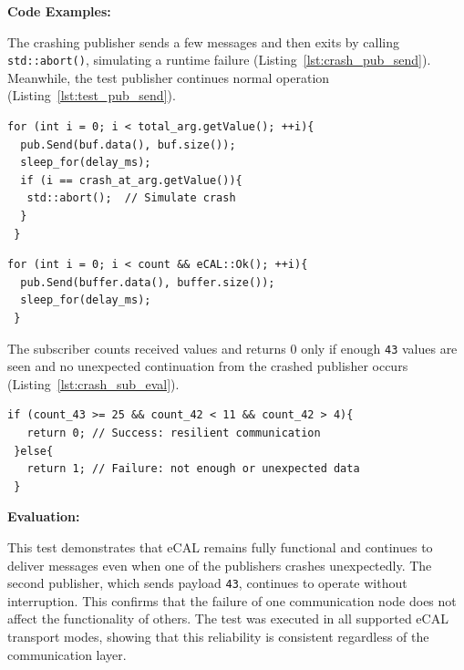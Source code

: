 \vspace{0.5em}

\textbf{Code Examples:}

\vspace{0.4em}
The crashing publisher sends a few messages and then exits by calling \texttt{std::abort()}, simulating a runtime failure (Listing~\ref{lst:crash_pub_send}). Meanwhile, the test publisher continues normal operation (Listing~\ref{lst:test_pub_send}).

\vspace{0.5em}
\begin{lstlisting}[style=cppstyle, caption={Crash publisher sends and exits after 10 messages}, label={lst:crash_pub_send}, captionpos=b]
 for (int i = 0; i < total_arg.getValue(); ++i){
  pub.Send(buf.data(), buf.size());
  sleep_for(delay_ms);
  if (i == crash_at_arg.getValue()){
   std::abort();  // Simulate crash
  }
 }
\end{lstlisting}
\vspace{0.5em}
\begin{lstlisting}[style=cppstyle, caption={Resilient publisher continues sending messages}, label={lst:test_pub_send}, captionpos=b]
 for (int i = 0; i < count && eCAL::Ok(); ++i){
  pub.Send(buffer.data(), buffer.size());
  sleep_for(delay_ms);
 }
\end{lstlisting}

The subscriber counts received values and returns 0 only if enough \texttt{43} values are seen and no unexpected continuation from the crashed publisher occurs (Listing~\ref{lst:crash_sub_eval}).

\vspace{0.5em}
\begin{lstlisting}[style=cppstyle, caption={Subscriber decision logic}, label={lst:crash_sub_eval}, captionpos=b]
 if (count_43 >= 25 && count_42 < 11 && count_42 > 4){
   return 0; // Success: resilient communication
 }else{
   return 1; // Failure: not enough or unexpected data
 }
\end{lstlisting}

\vspace{0.5em}

\textbf{Evaluation:}

This test demonstrates that eCAL remains fully functional and continues to deliver messages even when one of the publishers crashes unexpectedly. The second publisher, which sends payload \texttt{43}, continues to operate without interruption. This confirms that the failure of one communication node does not affect the functionality of others. The test was executed in all supported eCAL transport modes, showing that this reliability is consistent regardless of the communication layer.

